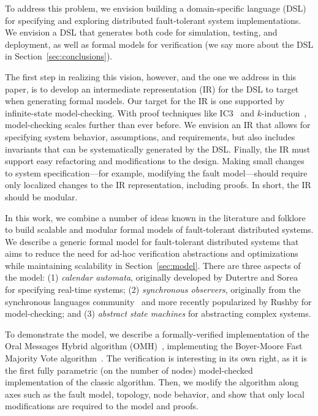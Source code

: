 \documentclass{llncs/llncs}
\begin{document}
To address this problem, we envision building a domain-specific language (DSL) for specifying and exploring distributed fault-tolerant system implementations. We envision a DSL that generates both code for simulation, testing, and deployment, as well as formal models for verification (we say more about the DSL in Section~\ref{sec:conclusions}).

The first step in realizing this vision, however, and the one we address in this paper, is to develop an intermediate representation (IR) for the DSL to target when generating formal models. Our target for the IR is one supported by infinite-state model-checking. With proof techniques like IC3~\cite{} and $k$-induction~\cite{}, model-checking scales further than ever before. We envision an IR that allows for specifying system behavior, assumptions, and requirements, but also includes invariants that can be systematically generated by the DSL. Finally, the IR must support easy refactoring and modifications to the design. Making small changes to system specification---for example, modifying the fault model---should require only localized changes to the IR representation, including proofs. In short, the IR should be modular.

In this work, we combine a number of ideas known in the literature and folklore to build scalable and modular formal models of fault-tolerant distributed systems. We describe a generic formal model for fault-tolerant distributed systems that aims to reduce the need for ad-hoc verification abstractions and optimizations while maintaining scalability in Section~\ref{sec:model}. There are three aspects of the model: (1) \emph{calendar automata}, originally developed by Dutertre and Sorea~\cite{cal} for specifying real-time systems; (2) \emph{synchronous observers}, originally from the synchronous languages community~\cite{} and more recently popularized by Rushby for model-checking; and (3) \emph{abstract state machines} for abstracting complex systems.

To demonstrate the model, we describe a formally-verified implementation of the Oral Messages Hybrid algorithm (OMH)~\cite{}, implementing the Boyer-Moore Fast Majority Vote algorithm~\cite{}. The verification is interesting in its own right, as it is the first fully parametric (on the number of nodes) model-checked implementation of the classic algorithm. Then, we modify the algorithm along axes such as the fault model, topology, node behavior, and show that only local modifications are required to the model and proofs.
\end{document}
